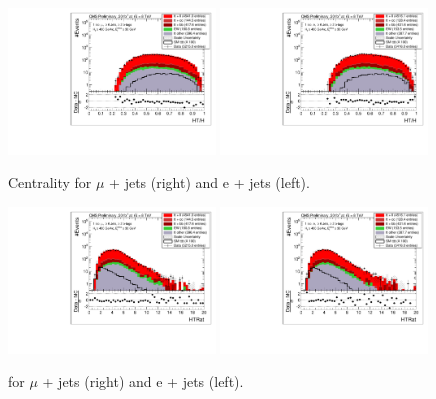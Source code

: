 \begin{figure}[!ht]
    \includegraphics[width=0.49\textwidth]{images/Run1/HTH_StackLogY_Mu.pdf}
    \includegraphics[width=0.49\textwidth]{images/Run1/HTH_StackLogY_e.pdf}
    \caption{Centrality for $\mu$ + jets (right) and e + jets (left).}
    \label{fig:centrality}
\end{figure}

\begin{figure}[!ht]
    \includegraphics[width=0.49\textwidth]{images/Run1/HTRat_StackLogY_Mu.pdf}
    \includegraphics[width=0.49\textwidth]{images/Run1/HTRat_StackLogY_e.pdf}
    \caption{\HTrat for $\mu$ + jets (right) and e + jets (left).}
    \label{fig:HTrat}
\end{figure}

